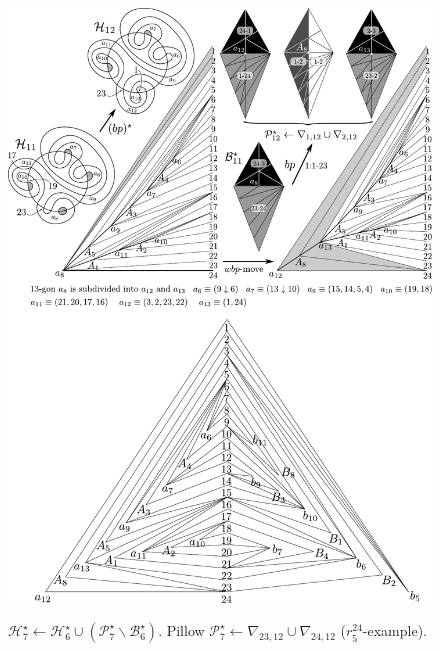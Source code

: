 \begin{figure}
\begin{center}
\includegraphics[width=15cm]{A.figs/bpandwinglist1112LW.pdf} \\
\caption{\sf 
$\mathcal{H}^\star_{7} \leftarrow \mathcal{H}^\star_6 
\cup (\mathcal{P}_{7}^\star \backslash \mathcal{B}_6^\star)$. 
Pillow $\mathcal{P}_{7}^\star \leftarrow 
\nabla_{23,12}\cup \nabla_{24,12}$
($r^{24}_5$-example).}
\label{fig:winglist06}
\end{center}
\end{figure}

